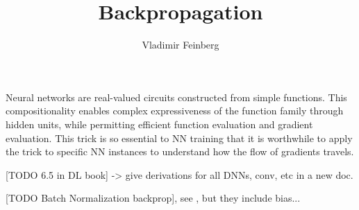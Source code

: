 \documentclass{article}
\title{Backpropagation}
\author{Vladimir Feinberg}
\begin{document}
\maketitle

Neural networks are real-valued circuits constructed from simple functions. This compositionality enables complex expressiveness of the function family through hidden units, while permitting efficient function evaluation and gradient evaluation. This trick is so essential to NN training that it is worthwhile to apply the trick to specific NN instances to understand how the flow of gradients travels.

[TODO 6.5 in DL book] -> give derivations for all DNNs, conv, etc in a new doc.

[TODO Batch Normalization backprop], see , but they include bias...
\end{document}
